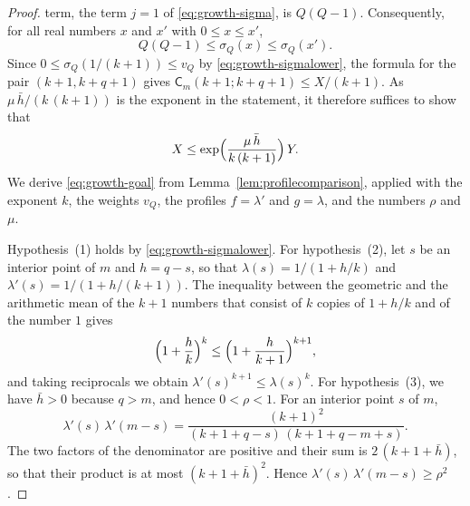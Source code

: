 \documentclass{amsart}
\theoremstyle{definition}
\theoremstyle{remark}
\numberwithin{equation}{section}
\begin{document}
\begin{proof}
term, the term $j=1$ of \eqref{eq:growth-sigma}, is $Q(Q-1)$. Consequently,
for all real numbers $x$ and $x'$ with $0\le x\le x'$,
\begin{equation}\label{eq:growth-sigmalower}
Q(Q-1)\le\sigma_Q(x)\le\sigma_Q(x').
\end{equation}
Since
$0\le\sigma_Q(1/(k+1))\le v_Q$ by \eqref{eq:growth-sigmalower}, the formula
for the pair $(k+1,k+q+1)$ gives $\mathsf C_m(k+1;k+q+1)\le X/(k+1)$. As
$\mu\,\bar h/(k\,(k+1))$ is the exponent in the statement, it therefore
suffices to show that
\begin{equation}\label{eq:growth-goal}
X\le\exp\Bigl(\frac{\mu\,\bar h}{k\,(k+1)}\Bigr)\,Y.
\end{equation}
We derive \eqref{eq:growth-goal} from Lemma~\ref{lem:profilecomparison},
applied with the exponent $k$, the weights $v_Q$, the profiles $f=\lambda'$
and $g=\lambda$, and the numbers $\rho$ and $\mu$.

Hypothesis~(1) holds by \eqref{eq:growth-sigmalower}. For hypothesis~(2),
let $s$ be an interior point of $m$ and $h=q-s$, so that
$\lambda(s)=1/(1+h/k)$ and $\lambda'(s)=1/(1+h/(k+1))$. The inequality
between the geometric and the arithmetic mean of the $k+1$ numbers that
consist of $k$ copies of $1+h/k$ and of the number $1$ gives
\[
\Bigl(1+\frac hk\Bigr)^{k}\le\Bigl(1+\frac h{k+1}\Bigr)^{k+1},
\]
and taking reciprocals we obtain $\lambda'(s)^{k+1}\le\lambda(s)^{k}$. For
hypothesis~(3), we have
$\bar h>0$ because $q>m$, and hence $0<\rho<1$. For an interior point $s$
of $m$,
\[
\lambda'(s)\,\lambda'(m-s)
=\frac{(k+1)^2}{(k+1+q-s)\,(k+1+q-m+s)}.
\]
The two factors of the denominator are positive and their sum is
$2\,(k+1+\bar h)$, so that their product is at most $(k+1+\bar h)^2$. Hence
$\lambda'(s)\,\lambda'(m-s)\ge\rho^2$.


\end{proof}
\end{document}
